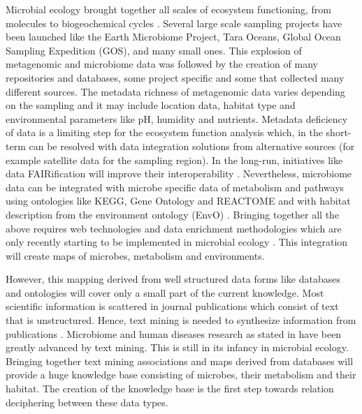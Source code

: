 Microbial ecology brought together all scales of ecosystem functioning, from
molecules to biogeochemical cycles \parencite{hall2018understanding,kempes2012Growth,raes2011molecular}.
Several large scale sampling projects have been launched like the Earth
Microbiome Project, Tara Oceans, Global Ocean Sampling Expedition (GOS), and
many small ones.
This explosion of metagenomic and microbiome data was followed by the creation
of many repositories and databases, some project specific and some that
collected many different sources. The metadata richness of metagenomic data
varies depending on the sampling and it may include location data, habitat type
and environmental parameters like pH, humidity and nutrients. Metadata
deficiency of data is a limiting step for the ecosystem function analysis
which, in the short-term can be resolved with data integration solutions from
alternative sources (for example satellite data for the sampling region). In
the long-run, initiatives like data FAIRification will improve their
interoperability \parencite{wilkinson2016the-fair}. Nevertheless, microbiome data can be integrated with microbe
specific data of metabolism and pathways using ontologies like KEGG, Gene
Ontology and REACTOME and with habitat description from the environment
ontology (EnvO) \parencite{buttigieg2016environment}. Bringing together all the above requires web technologies and
data enrichment methodologies which are only recently starting to be
implemented in microbial ecology \parencite{jiang2016Microbiome}. This integration
will create maps of microbes, metabolism and environments. 

However, this mapping derived from well structured data forms like databases
and ontologies will cover only a small part of the current knowledge. Most
scientific information is scattered in journal publications which consist of
text that is unstructured. Hence, text mining is needed to synthesize
information from publications \parencite{jensen2006Literature}. Microbiome and
human diseases research as stated in \parencite{badal2019Challenges} have been
greatly advanced by text mining. This is still in its infancy in microbial
ecology. Bringing together text mining associations and maps derived from
databases will provide a huge knowledge base consisting of microbes, their
metabolism and their habitat. The creation of the knowledge base is the first
step towards relation deciphering between these data types.

